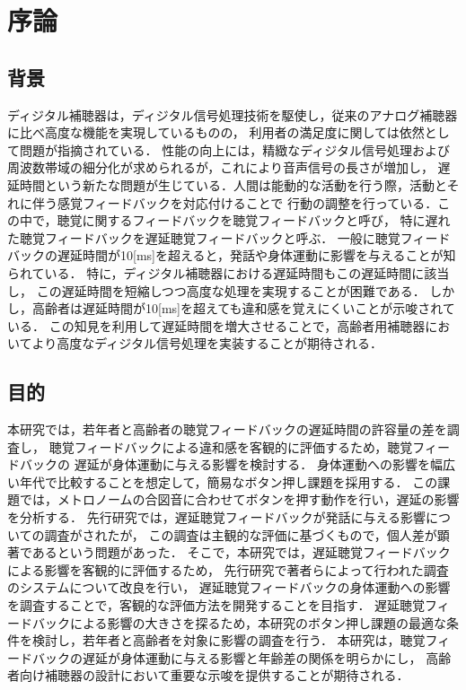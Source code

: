 \section{序論}
\subsection{背景}
ディジタル補聴器は，ディジタル信号処理技術を駆使し，従来のアナログ補聴器に比べ高度な機能を実現しているものの，
利用者の満足度に関しては依然として問題が指摘されている\cite{cf:Manzokudo}．
性能の向上には，精緻なディジタル信号処理および周波数帯域の細分化が求められるが，これにより音声信号の長さが増加し，
遅延時間という新たな問題が生じている．人間は能動的な活動を行う際，活動とそれに伴う感覚フィードバックを対応付けることで
行動の調整を行っている．この中で，聴覚に関するフィードバックを聴覚フィードバックと呼び，
特に遅れた聴覚フィードバックを遅延聴覚フィードバックと呼ぶ\cite{cf:DAF}．
一般に聴覚フィードバックの遅延時間が10[ms]を超えると，発話や身体運動に影響を与えることが知られている\cite{cf:DelayTime-ninnchi}．
特に，ディジタル補聴器における遅延時間もこの遅延時間に該当し，
この遅延時間を短縮しつつ高度な処理を実現することが困難である．
しかし，高齢者は遅延時間が10[ms]を超えても違和感を覚えにくいことが示唆されている\cite{shigematu-toukyoushibu}．
この知見を利用して遅延時間を増大させることで，高齢者用補聴器においてより高度なディジタル信号処理を実装することが期待される．
\subsection{目的}
本研究では，若年者と高齢者の聴覚フィードバックの遅延時間の許容量の差を調査し，
聴覚フィードバックによる違和感を客観的に評価するため，聴覚フィードバックの
遅延が身体運動に与える影響を検討する．
身体運動への影響を幅広い年代で比較することを想定して，簡易なボタン押し課題を採用する．
この課題では，メトロノームの合図音に合わせてボタンを押す動作を行い，遅延の影響を分析する．
先行研究\cite{cf:kayama}では，遅延聴覚フィードバックが発話に与える影響についての調査がされたが，
この調査は主観的な評価に基づくもので，個人差が顕著であるという問題があった．
そこで，本研究では，遅延聴覚フィードバックによる影響を客観的に評価するため，
先行研究\cite{cf:shigematu}で著者らによって行われた調査のシステムについて改良を行い，
遅延聴覚フィードバックの身体運動への影響を調査することで，客観的な評価方法を開発することを目指す．
遅延聴覚フィードバックによる影響の大きさを探るため，本研究のボタン押し課題の最適な条件を検討し，若年者と高齢者を対象に影響の調査を行う．
本研究は，聴覚フィードバックの遅延が身体運動に与える影響と年齢差の関係を明らかにし，
高齢者向け補聴器の設計において重要な示唆を提供することが期待される．